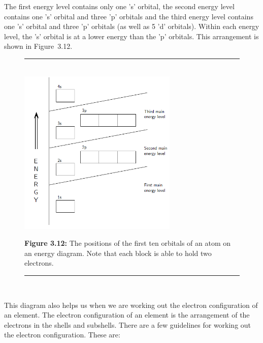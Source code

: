 \label{m38741*id6732}
The first energy level contains only one 's' orbital, the second energy level contains one 's' orbital and three 'p' orbitals and the third energy level contains one 's' orbital and three 'p' orbitals (as well as 5 'd' orbitals). Within each energy level, the 's' orbital is at a lower energy than the 'p' orbitals. This arrangement is shown in Figure~3.12.\par 
    \setcounter{subfigure}{0}
	\begin{figure}[H] %
    \begin{center}
    \rule[.1in]{\figurerulewidth}{.005in} \\
        \label{m38741*uid92!!!underscore!!!media}\label{m38741*uid92!!!underscore!!!printimage}\includegraphics[height=300px]{col11305.imgs/m38741_CG10C3_008.png} %
      \vspace{2pt}
    \vspace{\rubberspace}\par \begin{cnxcaption}
	  \small \textbf{Figure 3.12: }The positions of the first ten orbitals of an atom on an energy diagram. Note that each block is able to hold two electrons.
	\end{cnxcaption}
    \vspace{.1in}
    \rule[.1in]{\figurerulewidth}{.005in} \\
    \end{center}
 \end{figure}       
        \label{m38741*eip-752}This diagram also helps us when we are working out the electron configuration of an element. The electron configuration of an element is the arrangement of the electrons in the shells and subshells. There are a few guidelines for working out the electron configuration. These are:
